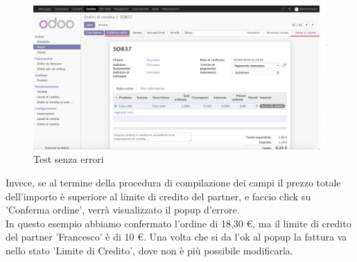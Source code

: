 \begin{figure}[H]
	\begin{center} \includegraphics[scale=0.3]{figures/first_test}
		\caption[Test senza errori]{Test senza errori}
		\label{fig:first_test}
	\end{center}
\end{figure}

Invece, se al termine della procedura di compilazione dei campi il prezzo totale dell'importo è superiore al limite di credito del partner, e faccio click su 'Conferma ordine', verrà visualizzato il popup d'errore.\\
In questo esempio abbiamo confermato l'ordine di 18,30 €, ma il limite di credito del partner 'Francesco' è di 10 €.
Una volta che si da l'ok al popup la fattura va nello stato 'Limite di Credito', dove non è più possibile modificarla.

